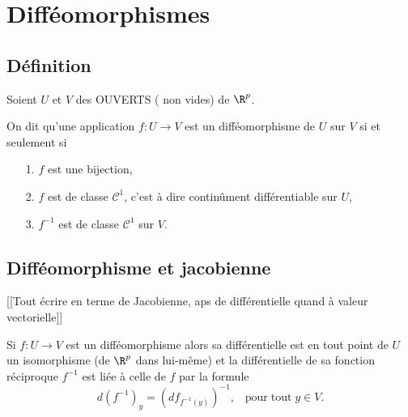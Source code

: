 \documentclass[12pt, class=report,crop=false]{standalone}
\begin{document}

\newcommand{\ou}{\mathscr{O}}
\newcommand{\f}{\mathscr{F}}
\newcommand{\mat}{\mathscr{M}}
\newcommand{\co}{\mathscr{C}}
\newcommand{\ja}{\mathrm{J}}
\newcommand{\jac}{|\mathrm{J}|}
\newcommand{\rot}{\mathrm{rot}}

\section{Difféomorphismes}

\subsection{Définition}

\noindent Soient $U$ et $V$ des OUVERTS ( non vides) de $\R^p$.
\begin{definition}[DIFFEOMORPHISME]
 \textcolor[rgb]{0.98,0.00,0.00}{ 
  On dit qu'une application $f: U \rightarrow V$ est un diff\'eomorphisme de $U$ sur $V$
si et seulement si
\begin{itemize}
  \item[1.] $f$ est une bijection,
  \item[2.] $f$ est de classe $\co^1$, c'est \`a dire contin\^ument diff\'erentiable sur $U$,
  \item[3.] $f^{-1}$ est de classe $\co^1$ sur $V$.
\end{itemize}}
\end{definition}

\subsection{Difféomorphisme et jacobienne}

[[Tout écrire en terme de Jacobienne, aps de différentielle quand à valeur vectorielle]]

\begin{proposition}
 \textcolor[rgb]{0.44,0.00,0.87}{
  Si $f: U \rightarrow V$ est un diff\'eomorphisme alors sa diff\'erentielle est en tout point de
$U$ un isomorphisme (de $\R^p$ dans lui-même) et la diff\'erentielle de sa fonction r\'eciproque $f^{-1}$
est li\'ee \`a celle de $f$ par la formule
\begin{equation*}
  d(f^{-1})_y=(df_{f^{-1}(y)})^{-1}, \;\;\mathrm{\; pour\; tout \;} y \in V.
\end{equation*}}
\end{proposition}
\end{document}
